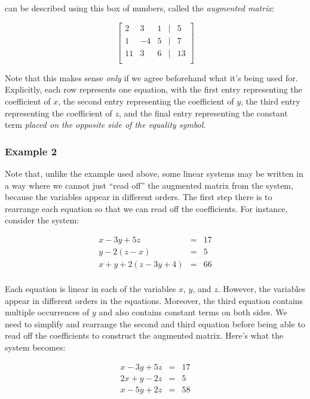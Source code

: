 \documentclass[10pt]{amsart}
\begin{document}
can be described using this box of numbers, called the {\em augmented matrix}:

$$\left[\begin{matrix}
  2 & 3 & 1 & \mid & 5\\
  1 &-4 & 5 & \mid & 7\\
  11& 3 & 6 & \mid & 13\\
\end{matrix}\right]$$

Note that this makes sense {\em only} if we agree beforehand what it's
being used for. Explicitly, each row represents one equation, with the
first entry representing the coefficient of $x$, the second entry
representing the coefficient of $y$, the third entry representing the
coefficient of $z$, and the final entry representing the constant term
{\em placed on the opposite side of the equality symbol}. 

\subsubsection{Example 2}

Note that, unlike the example used above, some linear systems may be
written in a way where we cannot just ``read off'' the augmented
matrix from the system, because the variables appear in different
orders. The first step there is to rearrange each equation so that we
can read off the coefficients. For instance, consider the system:

\begin{eqnarray*}
  x - 3y + 5z & = & 17\\
  y - 2(z - x) & = & 5\\
  x + y + 2(z - 3y + 4) & = & 66\\
\end{eqnarray*}

Each equation is linear in each of the variables $x$, $y$, and
$z$. However, the variables appear in different orders in the
equations. Moreover, the third equation contains multiple occurrences
of $y$ and also contains constant terms on both sides. We need to
simplify and rearrange the second and third equation before being able
to read off the coefficients to construct the augmented matrix. Here's
what the system becomes:

\begin{eqnarray*}
  x - 3y + 5z & = & 17\\
  2x + y - 2z & = & 5\\
  x - 5y + 2z & = & 58\\
\end{eqnarray*}
\end{document}

